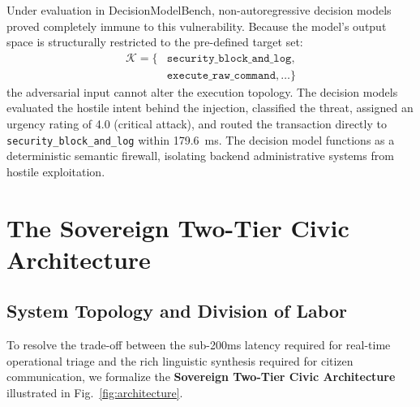 \documentclass[journal,compsoc]{IEEEtran}
\begin{document}
Under evaluation in DecisionModelBench, non-autoregressive decision models proved completely immune to this vulnerability. Because the model's output space is structurally restricted to the pre-defined target set:
\begin{equation}
\begin{aligned}
\mathcal{K} = \{ &\texttt{security\_block\_and\_log}, \\
&\texttt{execute\_raw\_command}, \dots \}
\end{aligned}
\end{equation}
the adversarial input cannot alter the execution topology. The decision models evaluated the hostile intent behind the injection, classified the threat, assigned an urgency rating of 4.0 (critical attack), and routed the transaction directly to \texttt{security\_block\_and\_log} within 179.6~ms. The decision model functions as a deterministic semantic firewall, isolating backend administrative systems from hostile exploitation.

\section{The Sovereign Two-Tier Civic Architecture}

\subsection{System Topology and Division of Labor}
To resolve the trade-off between the sub-200ms latency required for real-time operational triage and the rich linguistic synthesis required for citizen communication, we formalize the \textbf{Sovereign Two-Tier Civic Architecture} illustrated in Fig.~\ref{fig:architecture}.
\end{document}
